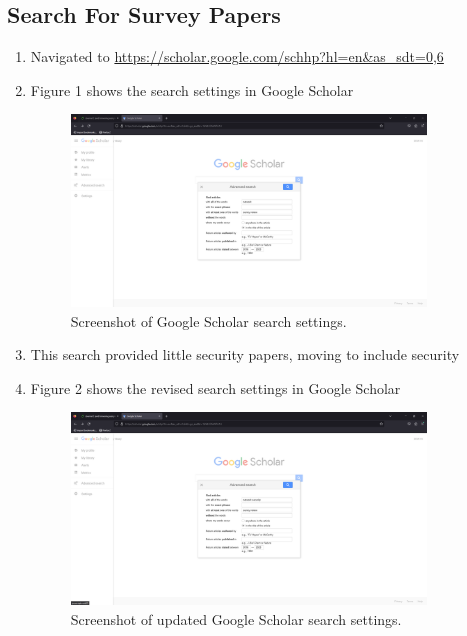 \documentclass{article}
\begin{document}
    \subsection{Search For Survey Papers}
        \begin{enumerate}
            \item Navigated to
                \url{https://scholar.google.com/schhp?hl=en&as_sdt=0,6}
            \item Figure 1 shows the search settings in Google Scholar
                \begin{figure}[ht!] %
                \centering
                \caption{\label{fig:TableOfContentsSnippet.png}Screenshot of Google Scholar search settings.}
                \includegraphics[width=0.89\textwidth, height=0.5\textwidth]{2023-09-10 14 18 04.png}
                \end{figure}
            \item This search provided little security papers, moving to include security
            \item Figure 2 shows the revised search settings in Google Scholar
                \begin{figure}[ht!] %
                \centering
                \caption{\label{fig:TableOfContentsSnippet.png}Screenshot of updated Google Scholar search settings.}
                \includegraphics[width=0.89\textwidth, height=0.5\textwidth]{2023-09-10 14 20 09.png}

\end{figure}
\end{enumerate}
\end{document}
